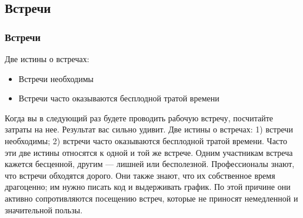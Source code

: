 \documentclass{../industrial-development}
\begin{document}
\subsection{Встречи}
\begin{frame} \frametitle{Встречи}
Две истины о встречах:
\begin{itemize}
  \item Встречи необходимы
  \item Встречи часто оказываются бесплодной тратой времени
\end{itemize}
\end{frame}
\lecturenotes
Когда вы в следующий раз будете проводить рабочую встречу, посчитайте затраты на нее. Результат вас сильно удивит.
Две истины о встречах:
1) встречи необходимы;
2) встречи часто оказываются бесплодной тратой времени.
Часто эти две истины относятся к одной и той же встрече. Одним участникам встреча кажется бесценной, другим — лишней или бесполезной. Профессионалы знают, что встречи обходятся дорого. Они также знают, что их собственное время драгоценно; им нужно писать код и выдерживать график. По этой причине они активно сопротивляются посещению встреч, которые не приносят немедленной и значительной пользы.
\end{document}
